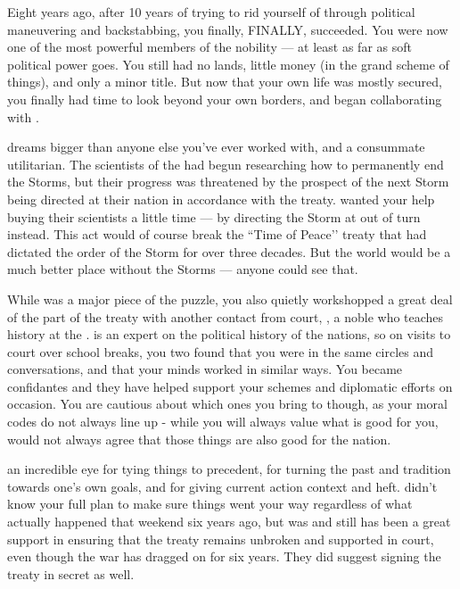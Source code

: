 \documentclass[char]{GL2020}
\begin{document}
Eight years ago, after 10 years of trying to rid yourself of \cEvilNemesis{} through political maneuvering and backstabbing, you finally, FINALLY, succeeded. You were now one of the most powerful members of the \pFarm{} nobility — at least as far as soft political power goes. You still had no lands, little money (in the grand scheme of things), and only a minor title. But now that your own life was mostly secured, you finally had time to look beyond your own borders, and began collaborating with \cDiplomat{\full}. 

\cDiplomat{} dreams bigger than anyone else you’ve ever worked with, and \cDiplomat{\theyare} a consummate utilitarian. The scientists of the \pTech{} had begun researching how to permanently end the Storms, but their progress was threatened by the prospect of the next Storm being directed at their nation in accordance with the treaty. \cDiplomat{} wanted your help buying their scientists a little time — by directing the Storm at \pShip{} out of turn instead. This act would of course break the ``Time of Peace’’ treaty that had dictated the order of the Storm for over three decades. But the world would be a much better place without the Storms — anyone could see that.  

While \cDiplomat{} was a major piece of the puzzle, you also quietly workshopped a great deal of the \pFarm{} part of the treaty with another contact from court, \cHistory{\intro}, a noble who teaches history at the \pSchool{}. \cHistory{} is an expert on the political history of the nations, so on \cHistory{\their} visits to court over school breaks, you two found that you were in the same circles and conversations, and that your minds worked in similar ways. You became confidantes and they have helped support your schemes and diplomatic efforts on occasion. You are cautious about which ones you bring to \cHistory{\them} though, as your moral codes do not always line up - while you will always value what  is good for you, \cHistory{} would not always agree that those things are also good for the nation.

 \cHistory{\They{} \have} an incredible eye for tying things to precedent, for turning the past and tradition towards one’s own goals, and for giving current action context and heft.  \cHistory{} didn’t know your full plan to make sure things went your way regardless of what actually happened that weekend six years ago, but was and still has been a great support in ensuring that the treaty remains unbroken and supported in court, even though the war has dragged on for six years.  They did suggest signing the treaty in secret as well.
\end{document}
